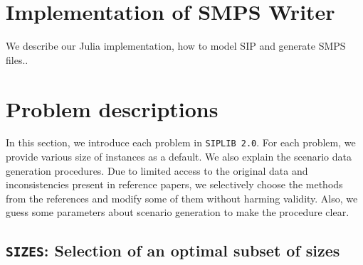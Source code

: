 \section{Implementation of SMPS Writer}

We describe our Julia implementation, how to model SIP and generate SMPS files..


\section{Problem descriptions} \label{sec:prob_desc}

In this section, we introduce each problem in \texttt{SIPLIB 2.0}.  For each problem, we provide various size of instances as a default. We also explain the scenario data generation procedures. Due to limited access to the original data and inconsistencies present in reference papers, we selectively choose the methods from the references and modify some of them without harming validity. Also, we guess some parameters about scenario generation to make the procedure clear.  %

\subsection{\texttt{SIZES}: Selection of an optimal subset of sizes}
